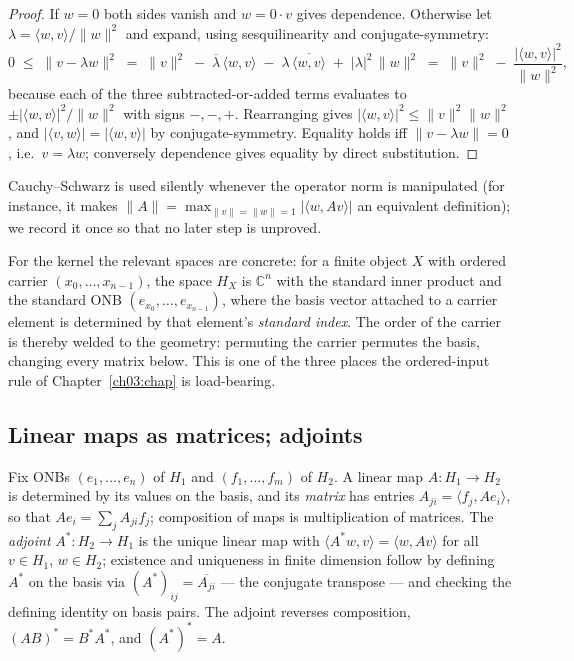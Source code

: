 \begin{proof}
If $w = 0$ both sides vanish and $w = 0 \cdot v$ gives dependence.
Otherwise let $\lambda = \langle w, v \rangle / \lVert w \rVert^{2}$
and expand, using sesquilinearity and conjugate-symmetry:
\[
0 \;\leq\; \lVert v - \lambda w \rVert^{2}
\;=\; \lVert v \rVert^{2}
\;-\; \overline{\lambda}\,\langle w, v \rangle
\;-\; \lambda\,\overline{\langle w, v \rangle}
\;+\; |\lambda|^{2}\,\lVert w \rVert^{2}
\;=\; \lVert v \rVert^{2}
\;-\; \frac{|\langle w, v \rangle|^{2}}{\lVert w \rVert^{2}},
\]
because each of the three subtracted-or-added terms evaluates to
$\pm |\langle w, v \rangle|^{2} / \lVert w \rVert^{2}$ with signs
$-, -, +$. Rearranging gives
$|\langle w, v \rangle|^{2} \leq \lVert v \rVert^{2}
\lVert w \rVert^{2}$, and $|\langle v, w \rangle| =
|\langle w, v \rangle|$ by conjugate-symmetry. Equality holds iff
$\lVert v - \lambda w \rVert = 0$, i.e.\ $v = \lambda w$; conversely
dependence gives equality by direct substitution.
\end{proof}

Cauchy--Schwarz is used silently whenever the operator norm is
manipulated (for instance, it makes
$\lVert A \rVert = \max_{\lVert v \rVert = \lVert w \rVert = 1}
|\langle w, A v \rangle|$ an equivalent definition); we record it once
so that no later step is unproved.

For the kernel the relevant spaces are concrete: for a finite object $X$
with ordered carrier $(x_0, \dots, x_{n-1})$, the space $H_X$ is
$\mathbb{C}^n$ with the standard inner product and the standard ONB
$(e_{x_0}, \dots, e_{x_{n-1}})$, where the basis vector attached to a
carrier element is determined by that element's \emph{standard index}. The
order of the carrier is thereby welded to the geometry: permuting the
carrier permutes the basis, changing every matrix below. This is one of
the three places the ordered-input rule of Chapter~\ref{ch03:chap} is
load-bearing.

\subsection{Linear maps as matrices; adjoints}

Fix ONBs $(e_1, \dots, e_n)$ of $H_1$ and $(f_1, \dots, f_m)$ of $H_2$. A
linear map $A : H_1 \to H_2$ is determined by its values on the basis, and
its \emph{matrix} has entries $A_{ji} = \langle f_j, A e_i \rangle$, so
that $A e_i = \sum_j A_{ji} f_j$; composition of maps is multiplication of
matrices. The \emph{adjoint} $A^{*} : H_2 \to H_1$ is the unique linear
map with $\langle A^{*} w, v \rangle = \langle w, A v \rangle$ for all
$v \in H_1$, $w \in H_2$; existence and uniqueness in finite dimension
follow by defining $A^{*}$ on the basis via
$(A^{*})_{ij} = \overline{A_{ji}}$ --- the conjugate transpose --- and
checking the defining identity on basis pairs. The adjoint reverses
composition, $(AB)^{*} = B^{*} A^{*}$, and $(A^{*})^{*} = A$.

